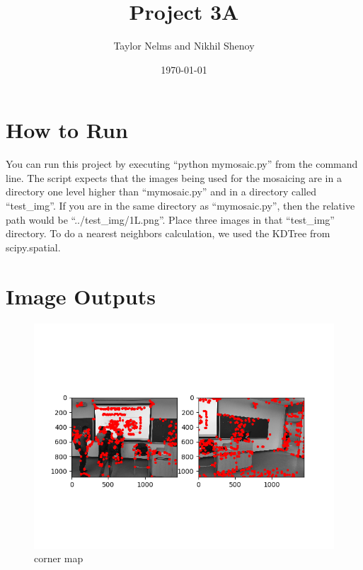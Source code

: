 \documentclass[10pt]{article}
\begin{document}
\title{\vspace{-2.0cm}Project 3A}
\author{Taylor Nelms and Nikhil Shenoy}
\date{\today}

\maketitle

\section{How to Run}
You can run this project by executing ``python mymosaic.py'' from the command line. The script expects that the images being used for the mosaicing are in a directory one level higher than ``mymosaic.py'' and in a directory called ``test\_img''. If you are in the same directory as ``mymosaic.py'', then the relative path would be ``../test\_img/1L.png''. Place three images in that ``test\_img'' directory. To do a nearest neighbors calculation, we used the KDTree from scipy.spatial.

\section{Image Outputs}

	\begin{figure}[h]
		\caption{corner map}
		\centering
		\includegraphics{ANMSl2m.png}
	\end{figure}
\end{document}
